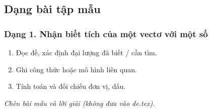 

\subsection{Dạng bài tập mẫu}
\subsubsection{Dạng 1. Nhận biết tích của một vectơ với một số}
\begin{phuongphap}
\begin{enumerate}
\item Đọc đề, xác định đại lượng đã biết / cần tìm.
\item Ghi công thức hoặc mô hình liên quan.
\item Tính toán và đối chiếu đơn vị, dấu.
\end{enumerate}
\end{phuongphap}
\begin{vidumau}
\textit{Chèn bài mẫu và lời giải (không đưa vào de.tex).}
\end{vidumau}

